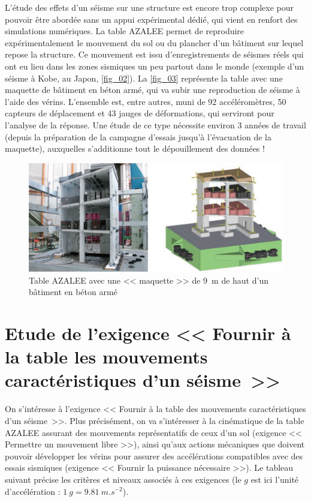 \documentclass[10pt,fleqn]{article} %
\begin{document}
L’étude des effets d’un séisme sur une structure est encore trop complexe pour pouvoir être abordée sans
un appui expérimental dédié, qui vient en renfort des simulations numériques. La table AZALEE permet de
reproduire expérimentalement le mouvement du sol ou du plancher d’un bâtiment sur lequel repose la structure.
Ce mouvement est issu d’enregistrements de séismes réels qui ont eu lieu dans les zones sismiques un peu
partout dans le monde (exemple d’un séisme à Kobe, au Japon, \autoref{fig_02}). La \autoref{fig_03} représente la table avec une maquette de bâtiment en béton armé, qui va subir une reproduction de séisme à l’aide des vérins. L’ensemble
est, entre autres, muni de 92 accéléromètres, 50 capteurs de déplacement et 43 jauges de déformations, qui
serviront pour l’analyse de la réponse. Une étude de ce type nécessite environ 3 années de travail (depuis
la préparation de la campagne d’essais jusqu’à l’évacuation de la maquette), auxquelles s’additionne tout le
dépouillement des données !


\begin{figure}[H]
\centering
\includegraphics[width=\linewidth]{fig_03}
\caption{Table AZALEE avec une << maquette >> de \SI{9}{m} de haut d’un bâtiment en béton armé \label{fig_03}}
\end{figure}


\section{Etude de l’exigence << Fournir à la table les mouvements caractéristiques d’un séisme~>>}

\begin{obj}
On s’intéresse à l’exigence << Fournir à la table des mouvements caractéristiques d’un séisme~>>.
Plus précisément, on va s’intéresser à la cinématique de la table AZALEE assurant des mouvements représentatifs de ceux d’un sol (exigence << Permettre un mouvement libre >>), ainsi qu’aux actions mécaniques que doivent pouvoir développer les vérins pour assurer des accélérations compatibles avec des essais sismiques (exigence << Fournir la puissance nécessaire >>). Le tableau suivant précise les critères et niveaux associés à ces exigences (le $g$ est ici l’unité d’accélération : $\SI{1}{g} = \SI{9, 81}{m.s^{-2}}$).
\end{obj}
\end{document}
